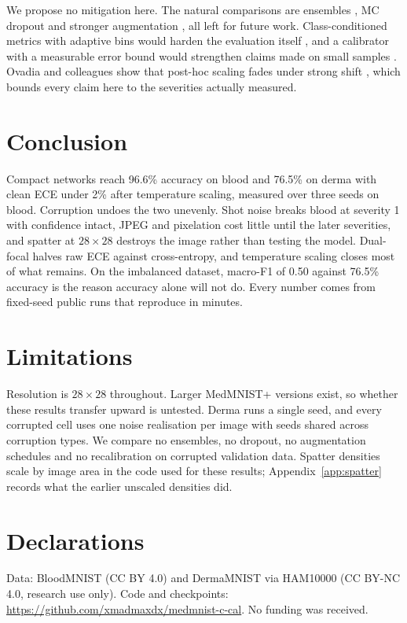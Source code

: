 \documentclass[a4paper,11pt,en,citestyle=authoryear,bibstyle=authoryear]{elegantpaper}
\begin{document}
We propose no mitigation here. The natural comparisons are ensembles \parencite{lakshminarayanan2017}, MC dropout \parencite{gal2016} and stronger augmentation \parencite{ovadia2019}, all left for future work. Class-conditioned metrics with adaptive bins would harden the evaluation itself \parencite{nixon2019}, and a calibrator with a measurable error bound would strengthen claims made on small samples \parencite{kumar2019}. Ovadia and colleagues show that post-hoc scaling fades under strong shift \parencite{ovadia2019}, which bounds every claim here to the severities actually measured.

\section{Conclusion}
Compact networks reach 96.6\% accuracy on blood and 76.5\% on derma with clean ECE under 2\% after temperature scaling, measured over three seeds on blood. Corruption undoes the two unevenly. Shot noise breaks blood at severity 1 with confidence intact, JPEG and pixelation cost little until the later severities, and spatter at $28\times28$ destroys the image rather than testing the model. Dual-focal halves raw ECE against cross-entropy, and temperature scaling closes most of what remains. On the imbalanced dataset, macro-F1 of 0.50 against 76.5\% accuracy is the reason accuracy alone will not do. Every number comes from fixed-seed public runs that reproduce in minutes.

\section*{Limitations}
Resolution is $28\times28$ throughout. Larger MedMNIST+ versions exist, so whether these results transfer upward is untested. Derma runs a single seed, and every corrupted cell uses one noise realisation per image with seeds shared across corruption types. We compare no ensembles, no dropout, no augmentation schedules and no recalibration on corrupted validation data. Spatter densities scale by image area in the code used for these results; Appendix~\ref{app:spatter} records what the earlier unscaled densities did.

\section*{Declarations}
Data: BloodMNIST (CC BY 4.0) and DermaMNIST via HAM10000 (CC BY-NC 4.0, research use only). Code and checkpoints: \url{https://github.com/xmadmaxdx/medmnist-c-cal}. No funding was received.
\end{document}
